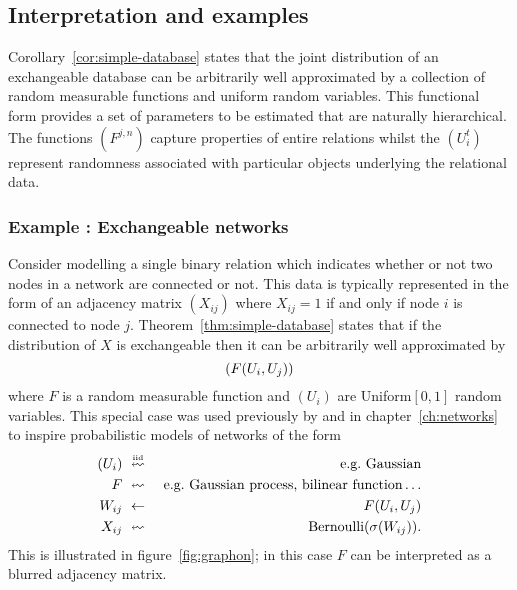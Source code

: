 \subsection{Interpretation and examples}

Corollary~\ref{cor:simple-database} states that the joint distribution of an exchangeable database can be arbitrarily well approximated by a collection of random measurable functions and uniform random variables.
This functional form provides a set of parameters to be estimated that are naturally hierarchical.
The functions $(F^{j,n})$ capture properties of entire relations whilst the $(U^t_i)$ represent randomness associated with particular objects underlying the relational data.

\subsubsection{Example : Exchangeable networks}

Consider modelling a single binary relation which indicates whether or not two nodes in a network are connected or not.
This data is typically represented in the form of an adjacency matrix $(X_{ij})$ where $X_{ij} = 1$ if and only if node $i$ is connected to node $j$.
Theorem~\ref{thm:simple-database} states that if the distribution of $X$ is exchangeable then it can be arbitrarily well approximated by
\begin{equation}
(F(U_i, U_j))
\end{equation}
where $F$ is a random measurable function and $(U_i)$ are \iid Uniform$[0,1]$ random variables.%
This special case was used previously by \cite{Hoff2007-ja,Roy2009-ge,Lloyd2012-sb} and in chapter~\ref{ch:networks} to inspire probabilistic models of networks of the form
\begin{eqnarray}
(\AHvar_i) & \probgetsiid & \textrm{\eg Gaussian} \\
F & \probgets & \textrm{\eg Gaussian process, bilinear function}\ldots \\
W_{ij} & \deterministicgets & F(\AHvar_i, \AHvar_j) \\
X_{ij} & \probgets & \textrm{Bernoulli}(\sigma(W_{ij}))\label{eq:graphon}.
\end{eqnarray}
This is illustrated in figure~\ref{fig:graphon}; in this case $F$ can be interpreted as a blurred adjacency matrix.


